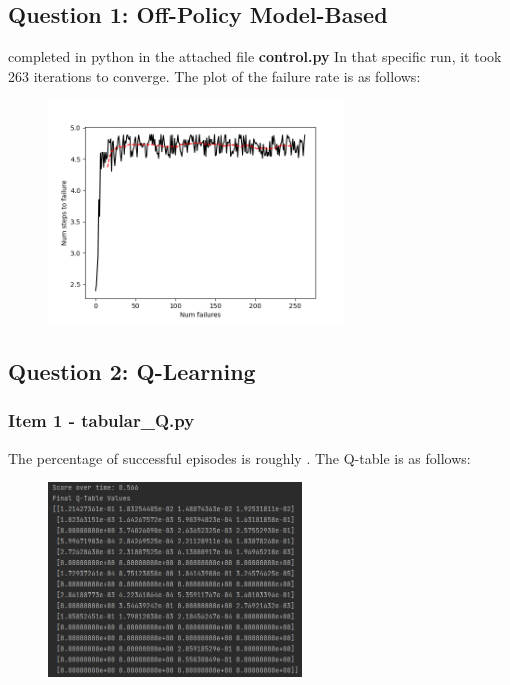 \documentclass{assignmeownt}
\begin{document}
\subsection{Question 1: Off-Policy Model-Based}
completed in python in the attached file \textbf{control.py}
\newline
In that specific run, it took 263 iterations to converge. The plot of the failure rate is as follows:
\begin{figure}[H]
    \centering
    \includegraphics[width=0.7\textwidth]{ex1_263_failure_plot.png}
\end{figure}

\subsection{Question 2: Q-Learning}
\subsubsection{Item 1 - tabular\_Q.py}
The percentage of successful episodes is roughly  . The Q-table is as follows:
\begin{figure}[H]
\centering
\includegraphics[width=0.6\textwidth]{Q_table_ex2_item1.png}
\end{figure}
\end{document}

